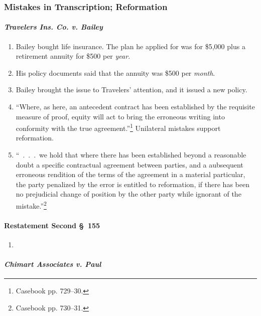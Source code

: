 \subsubsection{Mistakes in Transcription; Reformation}

\paragraph{\emph{Travelers Ins. Co. v. Bailey}}

\begin{enumerate}
    \item Bailey bought life insurance. The plan he applied for was for 
    \$5,000 plus a retirement annuity for \$500 per \emph{year}.
    \item His policy documents said that the annuity was \$500 per 
    \emph{month}.
    \item Bailey brought the issue to Travelers' attention, and it issued a 
    new policy.
    \item ``Where, as here, an antecedent contract has been established by the 
    requisite measure of proof, equity will act to bring the erroneous writing 
    into conformity with the true agreement.''\footnote{Casebook pp. 729--30.} 
    Unilateral mistakes support reformation.
    \item ``~.~.~.~we hold that where there has been established beyond a 
    reasonable doubt a specific contractual agreement between parties, and a 
    aubsequent erroneous rendition of the terms of the agreement in a material 
    particular, the party penalized by the error is entitled to reformation, 
    if there has been no prejudicial change of position by the other party 
    while ignorant of the mistake.''\footnote{Casebook pp. 730--31.}
\end{enumerate}

\paragraph{Restatement Second \S\ 155}

\begin{enumerate}
    \item %
\end{enumerate}

\paragraph{\emph{Chimart Associates v. Paul}}

